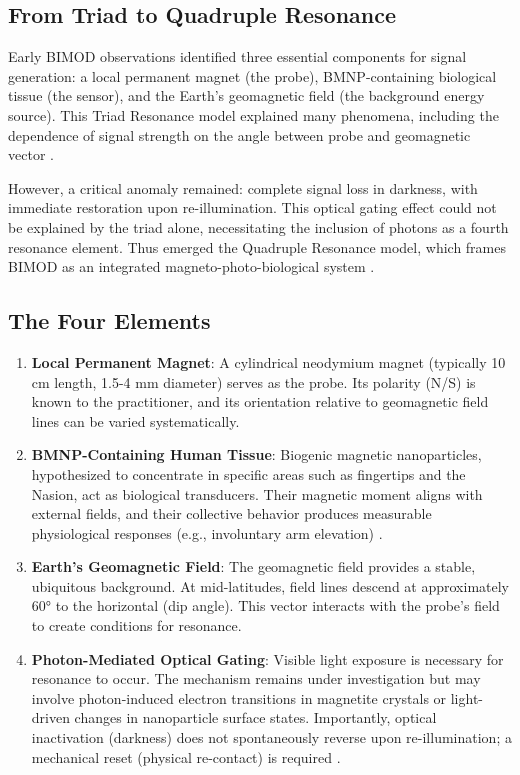 \documentclass[12pt,a4paper]{article}
\begin{document}
\subsection{From Triad to Quadruple Resonance}

Early BIMOD observations identified three essential components for signal generation: a local permanent magnet (the probe), BMNP-containing biological tissue (the sensor), and the Earth's geomagnetic field (the background energy source). This Triad Resonance model explained many phenomena, including the dependence of signal strength on the angle between probe and geomagnetic vector \cite{yoon2026_001}.

However, a critical anomaly remained: complete signal loss in darkness, with immediate restoration upon re-illumination. This optical gating effect could not be explained by the triad alone, necessitating the inclusion of photons as a fourth resonance element. Thus emerged the Quadruple Resonance model, which frames BIMOD as an integrated magneto-photo-biological system \cite{yoon2026_001v3}.

\subsection{The Four Elements}

\begin{enumerate}
    \item \textbf{Local Permanent Magnet}: A cylindrical neodymium magnet (typically 10 cm length, 1.5-4 mm diameter) serves as the probe. Its polarity (N/S) is known to the practitioner, and its orientation relative to geomagnetic field lines can be varied systematically.
    
    \item \textbf{BMNP-Containing Human Tissue}: Biogenic magnetic nanoparticles, hypothesized to concentrate in specific areas such as fingertips and the Nasion, act as biological transducers. Their magnetic moment aligns with external fields, and their collective behavior produces measurable physiological responses (e.g., involuntary arm elevation) \cite{yoon2026_004}.
    
    \item \textbf{Earth's Geomagnetic Field}: The geomagnetic field provides a stable, ubiquitous background. At mid-latitudes, field lines descend at approximately 60° to the horizontal (dip angle). This vector interacts with the probe's field to create conditions for resonance.
    
    \item \textbf{Photon-Mediated Optical Gating}: Visible light exposure is necessary for resonance to occur. The mechanism remains under investigation but may involve photon-induced electron transitions in magnetite crystals or light-driven changes in nanoparticle surface states. Importantly, optical inactivation (darkness) does not spontaneously reverse upon re-illumination; a mechanical reset (physical re-contact) is required \cite{yoon2026_001}.
\end{enumerate}
\end{document}
